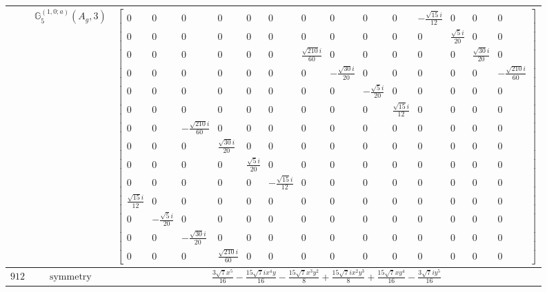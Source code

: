 \documentclass[fleqn,8pt,landscape]{jsarticle}
\begin{document}
\begin{longtable}{ccc}
$  $ & $ \mathbb{G}_{5}^{(1,0;a)}(A_{g},3) $ & $ \begin{bmatrix} 0 & 0 & 0 & 0 & 0 & 0 & 0 & 0 & 0 & 0 & - \frac{\sqrt{15} i}{12} & 0 & 0 & 0 \\ 0 & 0 & 0 & 0 & 0 & 0 & 0 & 0 & 0 & 0 & 0 & \frac{\sqrt{5} i}{20} & 0 & 0 \\ 0 & 0 & 0 & 0 & 0 & 0 & \frac{\sqrt{210} i}{60} & 0 & 0 & 0 & 0 & 0 & \frac{\sqrt{30} i}{20} & 0 \\ 0 & 0 & 0 & 0 & 0 & 0 & 0 & - \frac{\sqrt{30} i}{20} & 0 & 0 & 0 & 0 & 0 & - \frac{\sqrt{210} i}{60} \\ 0 & 0 & 0 & 0 & 0 & 0 & 0 & 0 & - \frac{\sqrt{5} i}{20} & 0 & 0 & 0 & 0 & 0 \\ 0 & 0 & 0 & 0 & 0 & 0 & 0 & 0 & 0 & \frac{\sqrt{15} i}{12} & 0 & 0 & 0 & 0 \\ 0 & 0 & - \frac{\sqrt{210} i}{60} & 0 & 0 & 0 & 0 & 0 & 0 & 0 & 0 & 0 & 0 & 0 \\ 0 & 0 & 0 & \frac{\sqrt{30} i}{20} & 0 & 0 & 0 & 0 & 0 & 0 & 0 & 0 & 0 & 0 \\ 0 & 0 & 0 & 0 & \frac{\sqrt{5} i}{20} & 0 & 0 & 0 & 0 & 0 & 0 & 0 & 0 & 0 \\ 0 & 0 & 0 & 0 & 0 & - \frac{\sqrt{15} i}{12} & 0 & 0 & 0 & 0 & 0 & 0 & 0 & 0 \\ \frac{\sqrt{15} i}{12} & 0 & 0 & 0 & 0 & 0 & 0 & 0 & 0 & 0 & 0 & 0 & 0 & 0 \\ 0 & - \frac{\sqrt{5} i}{20} & 0 & 0 & 0 & 0 & 0 & 0 & 0 & 0 & 0 & 0 & 0 & 0 \\ 0 & 0 & - \frac{\sqrt{30} i}{20} & 0 & 0 & 0 & 0 & 0 & 0 & 0 & 0 & 0 & 0 & 0 \\ 0 & 0 & 0 & \frac{\sqrt{210} i}{60} & 0 & 0 & 0 & 0 & 0 & 0 & 0 & 0 & 0 & 0 \end{bmatrix} $ \\ \hline
$ 912 $ & $ \text{symmetry} $ & $ \frac{3 \sqrt{7} x^{5}}{16} - \frac{15 \sqrt{7} i x^{4} y}{16} - \frac{15 \sqrt{7} x^{3} y^{2}}{8} + \frac{15 \sqrt{7} i x^{2} y^{3}}{8} + \frac{15 \sqrt{7} x y^{4}}{16} - \frac{3 \sqrt{7} i y^{5}}{16} $ \\

\end{longtable}
\end{document}
